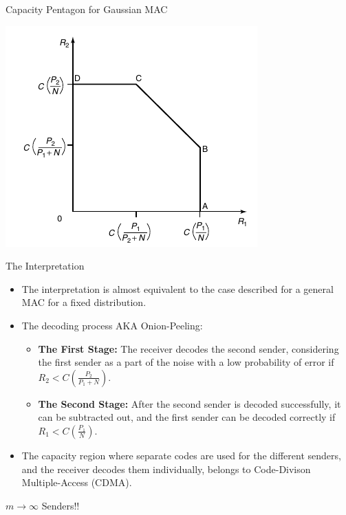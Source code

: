 \documentclass{beamer}
\newcommand{\red}[1]{{\color{red} #1}}
\newcommand{\blue}[1]{{\color{blue} #1}}
\begin{document}
{\begin{frame}{Capacity Pentagon for Gaussian MAC}
\begin{itemize}
	\end{itemize}
\end{frame}
\begin{frame}
\begin{center}
\includegraphics[scale=0.55]{Diagrams/GMACC.png}    
\end{center}
%
\end{frame}
\begin{frame}{The Interpretation}
 \begin{itemize}
	\justifying

\item<1-> The interpretation is almost equivalent to the case described for a general MAC  for a fixed distribution. 

\item<2-> The decoding process AKA \blue{Onion-Peeling}:
\begin{itemize}
    \item  \textbf{The First Stage:} The receiver decodes the second sender, considering the first sender as a part of the noise with a low probability of error if $R_2 < C(\frac{P_2}{P_1+N})$.

    \item \textbf{The Second Stage:} After the second sender is decoded successfully, it can be subtracted out, and the first sender can be decoded correctly if $R_1 < C(\frac{P_1}{N})$. 
\end{itemize}
%

\item<3-> The capacity region where separate codes are used for the different senders, and the receiver decodes them individually, belongs to \red{Code-Divison Multiple-Access (CDMA)}.
	\end{itemize}
\end{frame}
\begin{frame}{$m \rightarrow \infty$ Senders!!}
 \begin{itemize}
	\justifying


\end{itemize}
\end{frame}}
\end{document}

